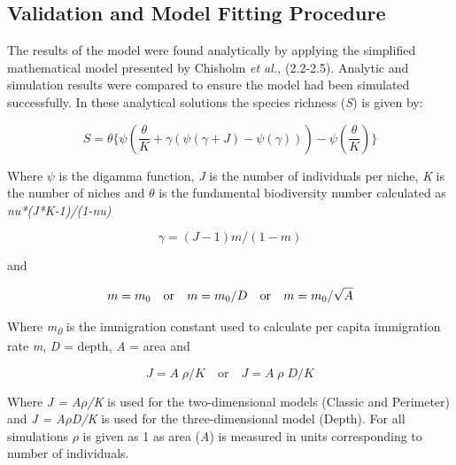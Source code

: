  
\subsection{Validation and Model Fitting Procedure}

\noindent The results of the model were found analytically by applying the simplified mathematical model presented by Chisholm \textit{et al.,} (2.2-2.5).
Analytic and simulation results were compared to ensure the model had been simulated successfully. In these analytical solutions the species richness (\textit{S}) is given by: 

\begin{equation}
S=\theta\{\psi(\frac{\theta}{K}+\gamma(\psi(\gamma+J)-\psi(\gamma)))-\psi(\frac{\theta}{K})\}
\end{equation} 

\begin{center}
\noindent Where $\psi$ is the digamma function, \textit{J} is the number of individuals per niche, \textit{K} is the number of niches and $\theta$ is the fundamental biodiversity number calculated as \textit{nu*(J*K-1)/(1-nu)} 
\end{center}

\begin{equation}
\gamma=(J-1)m/(1-m)
\end{equation}

\begin{center}
and 
\end{center}

\begin{equation}
 m=m\textsubscript{0}
 \quad\mathrm{or}\quad
 m=m\textsubscript{0}/D   
 \quad\mathrm{or}\quad
 m = m\textsubscript{0}/\sqrt{A}
\end{equation}

\noindent Where \textit{m\textsubscript{0}} is the immigration constant used to calculate per capita immigration rate \textit{m}, \textit{D} = depth, \textit{A} = area and

\begin{equation}
J=A\;{\rho}/K
 \quad\mathrm{or}\quad
J=A\;{\rho}\;D/K
\end{equation}

\noindent Where \textit{J = A\;$\rho$/K} is used for the two-dimensional models (Classic and Perimeter) and \textit{J = A\;$\rho$\;D/K} is used for the three-dimensional model (Depth). For all simulations $\rho$ is given as 1 as area (\textit{A}) is measured in units corresponding to number of individuals. \\

